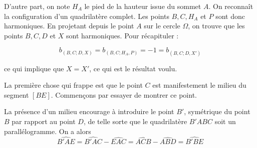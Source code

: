 \begin{sol}
\medskip

D'autre part, on note $H_A$ le pied de la hauteur issue du sommet $A$. On reconnaît la configuration d'un quadrilatère complet. Les points $B,C,H_A$ et $P$ sont donc harmoniques. En projetant depuis le point $A$ sur le cercle $\Omega$, on trouve que les points $B,C,D$ et $X$ sont harmoniques. Pour récapituler : 

$$b_{(B,C;D,X)}=b_{(B,C;H_A,P)}= -1=b_{(B,C;D,X')}$$

ce qui implique que $X=X'$, ce qui est le résultat voulu.
\end{sol}


\begin{sol}
\begin{center}
\end{center}

La première chose qui frappe est que le point $C$ est manifestement le milieu du segment $[BE]$. Commençons par essayer de montrer ce point. 

La présence d'un milieu encourage à introduire le point $B'$, symétrique du point $B$ par rapport au point $D$, de telle sorte que le quadrilatère $B'ABC$ soit un parallélogramme. On a alors
$$\widehat{B'AE}= \widehat{B'AC}-\widehat{EAC}=\widehat{ACB}-\widehat{ABD}=\widehat{B'BE}$$


\end{sol}
